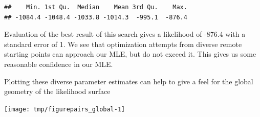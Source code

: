 \begin{frame}[fragile]

\begin{knitrout}\small
{}\color{fgcolor}\begin{kframe}
\begin{alltt}
 \hlkwb{<-} \hlstd{(}\hlstd{=lik_m3[,}\hlstd{],}\hlstd{=lik_m3[,}\hlstd{],}
  \hlstd{(}
\hlopt{>}\hlstd{)} \hlstd{=}\hlstd{,}
  \hlstd{=}\hlstd{,}\hlstd{=}\hlstd{,}\hlstd{=}\hlstd{)}
\hlopt{$}\hlstd{=}\hlstd{)}
\end{alltt}
\begin{verbatim}
##    Min. 1st Qu.  Median    Mean 3rd Qu.    Max. 
## -1084.4 -1048.4 -1033.8 -1014.3  -995.1  -876.4
\end{verbatim}
\end{kframe}
\end{knitrout}

\bi

\item Evaluation of the best result of this search gives a likelihood of -876.4 with a standard error of 1. We see that optimization attempts from diverse remote starting points can approach our MLE, but do not exceed it. This gives us some reasonable confidence in our MLE. 

\item Plotting these diverse parameter estimates can help to give a feel for the global geometry of the likelihood surface 

\ei

\end{frame}


\begin{frame}[fragile]

\begin{knitrout}\small
{}\color{fgcolor}\begin{kframe}
\begin{alltt}
\hlstd{(}\hlopt{~}\hlopt{+}\hlopt{+}\hlopt{+}\hlopt{+}\hlopt{+}
  \hlstd{=}\hlopt{>}\hlopt{-}\hlstd{))}
\end{alltt}
\end{kframe}

{\centering \texttt{[image: tmp/figurepairs\_global-1]} 

}



\end{knitrout}

\end{frame}

